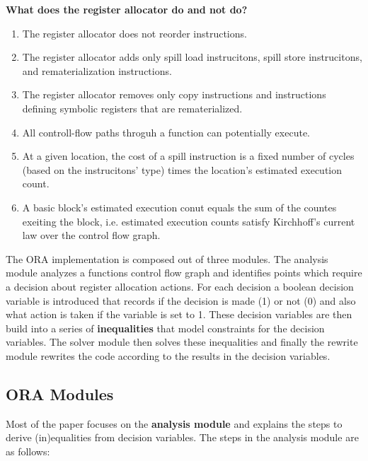 \documentclass[a4paper,10pt]{article}
\begin{document}
\noindent \textbf{What does the register allocator do and not do?}
\begin{enumerate}
 \item The register allocator does not reorder instructions.
 \item The register allocator adds only spill load instrucitons, spill store instrucitons, and rematerialization instructions.
 \item The register allocator removes only copy instructions and instructions defining symbolic registers that are rematerialized.
 \item All controll-flow paths throguh a function can potentially execute.
 \item At a given location, the cost of a spill instruction is a fixed number of cycles (based on the instrucitons' type) times the 
       location's estimated execution count.
 \item A basic block's estimated execution conut equals the sum of the countes exeiting the block, i.e. estimated execution counts 
       satisfy Kirchhoff's current law over the control flow graph.
\end{enumerate}

The ORA implementation is composed out of three modules. The analysis module analyzes a functions control flow graph and identifies 
points which require a decision about register allocation actions. For each decision a boolean decision variable is introduced that 
records if the decision is made (1) or not (0) and also what action is taken if the variable is set to 1. These decision variables are 
then build into a series of \textbf{inequalities} that model constraints for the decision variables. The solver module then solves these 
inequalities and finally the rewrite module rewrites the code according to the results in the decision variables.

\subsection{ORA Modules}
Most of the paper focuses on the \textbf{analysis module} and explains the steps to derive (in)equalities from decision variables. The 
steps in the analysis module are as follows:
\end{document}
